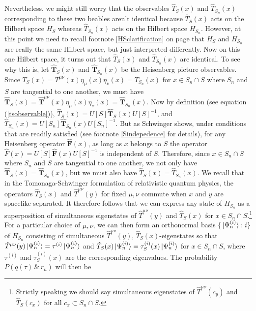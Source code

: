 {Nevertheless, we might still worry that the observables $\hat{T}_{S}(x)$ and  $\hat{T}_{S_n}(x)$ corresponding to these two beables aren't identical because $\hat{T}_{S}(x)$ acts on the Hilbert space $H_S$ whereas $\hat{T}_{S_n}(x)$ acts on the Hilbert space $H_{S_n}$. However, at this point we need to recall footnote \ref{HSclarification} on page \pageref{HSclarification} that $H_{S}$ and $H_{S_n}$ are really the same Hilbert space, but just interpreted differently. Now on this one Hilbert space, it turns out that $\hat{T}_{S}(x)$ and  $\hat{T}_{S_n}(x)$ are identical. To see why this is, let $\hat{\bm{T}}_S(x)$ and $\hat{\bm{T}}_{S_n}(x)$ be the Heisenberg picture observables. Since $T_S(x)=T^{\mu\nu}(x)\eta_{\mu}(x)\eta_{\nu}(x)=T_{S_n}(x)$ for $x\in S_n\cap S$ where $S_n$ and $S$ are tangential to one another, we must have $\hat{\bm{T}}_S(x)=\hat{\bm{T}}^{\mu\nu}(x)\eta_{\mu}(x)\eta_{\nu}(x)=\hat{\bm{T}}_{S_n}(x)$. Now by definition (see equation (\ref{tsobservable})), $\hat{T}_S(x)=U[S]\hat{\bm{T}}_S(x)U[S]^{-1}$, and $\hat{T}_{S_n}(x)=U[S_n]\hat{\bm{T}}_{S_n}(x)U[S_n]^{-1}$.  But as Schwinger shows, under conditions that are readily satisfied (see footnote \ref{Sindepedence} for details), for any Heisenberg operator $\hat{\bm{F}}(x)$, as long as $x$ belongs to $S$ the operator $\hat{F}(x)=U[S]\hat{\bm{F}}(x)U[S]^{-1}$ is independent of $S$. Therefore, since $x\in S_n\cap S$ where $S_n$ and $S$ are tangential to one another, we not only have $\hat{\bm{T}}_S(x)=\hat{\bm{T}}_{S_n}(x)$, but we must also have $\hat{T}_S(x)=\hat{T}_{S_n}(x)$.} We recall that in the Tomonaga-Schwinger formulation of relativistic quantum physics, the operators $\hat{T}_S(x)$ and $\hat{T}^{\mu\nu}(y)$ for fixed $\mu,\nu$ commute when $x$ and $y$ are spacelike-separated. It therefore follows that we can express any state of $H_{S_n}$ as a superposition of simultaneous eigenstates of $\hat{T}^{\mu\nu}(y)$ and $\hat{T}_S(x)$ for $x\in S_n\cap S$.\footnote{Strictly \label{snapprox} speaking we should say simultaneous eigenstates of $\hat{T}^{\mu\nu}(c_y)$ and $\hat{T}_S(c_x)$ for all $c_x\subset S_n\cap S$.}  For a particular choice of $\mu,\nu$, we can then form an orthonormal basis $\{\ket*{\Psi_{n}^{(i)}}:i\}$ of $H_{S_n}$ consisting of simultaneous $\hat{T}^{\mu\nu}(y)$, $\hat{T}_S(x)$-eigenstates so that $\hat{T}^{\mu\nu}(y)\ket*{\Psi_{n}^{(i)}}=\tau^{(i)}\ket*{\Psi_{n}^{(i)}}$ and $\hat{T}_{S}(x)\ket*{\Psi_{n}^{(i)}}=\tau_S^{(i)}(x)\ket*{\Psi_{n}^{(i)}}$ for $x\in S_n\cap S$, where $\tau^{(i)}$ and $\tau_S^{(i)}(x)$ are the corresponding eigenvalues. The probability $P(q(\tau) \, \&\,  r_n)$ will then be
